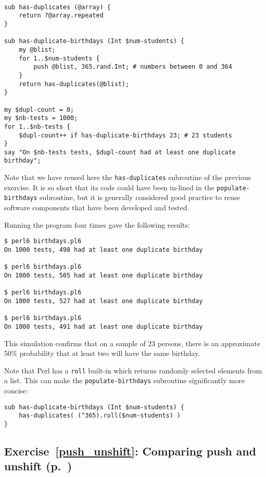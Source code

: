 {\begin{verbatim}

sub has-duplicates (@array) {
    return ?@array.repeated
}

sub has-duplicate-birthdays (Int $num-students) {
    my @blist;
    for 1..$num-students {
        push @blist, 365.rand.Int; # numbers between 0 and 364
    }
    return has-duplicates(@blist);
}

my $dupl-count = 0;
my $nb-tests = 1000;
for 1..$nb-tests {
    $dupl-count++ if has-duplicate-birthdays 23; # 23 students
}
say "On $nb-tests tests, $dupl-count had at least one duplicate birthday";
\end{verbatim}

Note that we have reused here the {\tt has-duplicates} 
subroutine of the previous exercise. It is so short 
that its code could have been in-lined in the 
\verb'populate-birthdays'  
subroutine, but it is 
generally considered good practice to reuse software 
components that have been developed and tested.

Running the program four times gave the following 
results:

\begin{verbatim}
$ perl6 birthdays.pl6
On 1000 tests, 498 had at least one duplicate birthday

$ perl6 birthdays.pl6
On 1000 tests, 505 had at least one duplicate birthday

$ perl6 birthdays.pl6
On 1000 tests, 527 had at least one duplicate birthday

$ perl6 birthdays.pl6
On 1000 tests, 491 had at least one duplicate birthday
\end{verbatim}

This simulation confirms that on a sample of 23 persons, 
there is an approximate 50\% probability that at least 
two will have the same birthday.

Note that Perl has a {\tt roll} built-in which returns 
randomly selected elements from a list. This can make 
the {\tt populate-birthdays} subroutine significantly 
more concise:

\begin{verbatim}
sub has-duplicate-birthdays (Int $num-students) {
    has-duplicates( (^365).roll($num-students) )
}
\end{verbatim}

\subsection{Exercise~\ref{push_unshift}: Comparing push and unshift (p.~\pageref{push_unshift})}
\label{sol_push_unshift}

}
